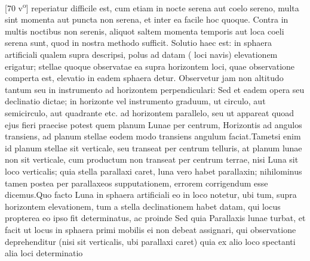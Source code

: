 [70 v\textsuperscript{o}] reperiatur difficile est, cum etiam in nocte serena aut coelo sereno, multa sint momenta aut puncta non serena, et inter ea facile hoc quoque. Contra in multis noctibus non serenis, aliquot saltem momenta temporis aut loca coeli serena sunt, quod in nostra methodo sufficit.\pend
\pstart Solutio haec est: in sphaera artificiali qualem supra descripsi, polus\protect{} ad datam ( loci navis\protect{}) elevationem erigatur; stellae\protect{} quoque observatae ea supra horizontem loci, quae observatione comperta est, elevatio in eadem sphaera detur. Observetur jam \protect{}non altitudo tantum seu  in instrumento ad horizontem perpendiculari: Sed et eadem opera seu declinatio\protect{} \protect{} \protect{}dictae; in horizonte vel instrumento graduum, ut circulo, aut semicirculo, aut quadrante etc. ad horizontem parallelo, seu ut appareat quoad ejus fieri praecise potest quem planum Lunae\protect{} per centrum, Horizontis ad angulos  transiens, ad planum stellae\protect{} eodem modo transiens angulum faciat.\pend \pstart Tametsi enim id planum stellae\protect{} sit verticale, seu transeat per centrum telluris\protect{}, at planum lunae\protect{} non sit verticale, cum productum non transeat per centrum terrae, nisi Luna\protect{} sit loco verticalis; quia stella\protect{} parallaxi\protect{} caret, luna\protect{} vero habet parallaxin\protect{}; nihilominus tamen postea per parallaxeos\protect{} supputationem, errorem corrigendum esse dicemus.\pend \pstart Quo facto Luna\protect{} in sphaera artificiali eo in loco notetur, ubi tum, supra horizontem elevationem, tum a stella declinationem\protect{} habet datam, qui locus propterea
eo ipso fit determinatus, ac proinde \protect{}\protect{}\pend \pstart
Sed quia Parallaxis\protect{} lunae\protect{} turbat, et facit ut locus in sphaera primi mobilis ei non debeat assignari, qui observatione deprehenditur (nisi  sit  verticalis, ubi parallaxi\protect{} caret) quia ex alio loco spectanti alia loci determinatio 